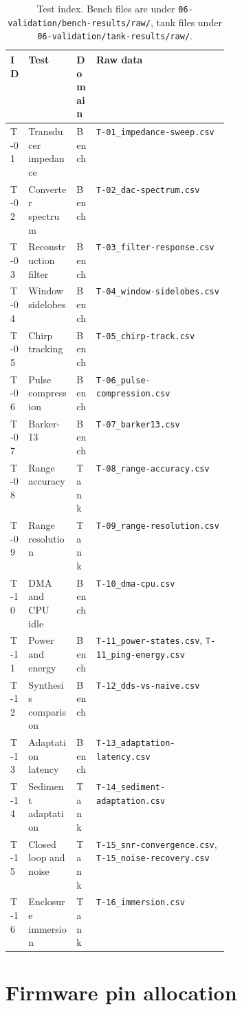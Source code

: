 \documentclass[11pt,a4paper]{article}
\begin{document}
\begin{table}[htbp]
\centering
\small
\begin{tabularx}{\linewidth}{L{0.06\linewidth}L{0.22\linewidth}L{0.09\linewidth}Y}
\toprule
\textbf{ID} & \textbf{Test} & \textbf{Domain} & \textbf{Raw data} \\
\midrule
T-01 & Transducer impedance & Bench & \texttt{T-01\_impedance-sweep.csv} \\
T-02 & Converter spectrum & Bench & \texttt{T-02\_dac-spectrum.csv} \\
T-03 & Reconstruction filter & Bench & \texttt{T-03\_filter-response.csv} \\
T-04 & Window sidelobes & Bench & \texttt{T-04\_window-sidelobes.csv} \\
T-05 & Chirp tracking & Bench & \texttt{T-05\_chirp-track.csv} \\
T-06 & Pulse compression & Bench & \texttt{T-06\_pulse-compression.csv} \\
T-07 & Barker-13 & Bench & \texttt{T-07\_barker13.csv} \\
T-08 & Range accuracy & Tank & \texttt{T-08\_range-accuracy.csv} \\
T-09 & Range resolution & Tank & \texttt{T-09\_range-resolution.csv} \\
T-10 & DMA and CPU idle & Bench & \texttt{T-10\_dma-cpu.csv} \\
T-11 & Power and energy & Bench & \texttt{T-11\_power-states.csv}, \texttt{T-11\_ping-energy.csv} \\
T-12 & Synthesis comparison & Bench & \texttt{T-12\_dds-vs-naive.csv} \\
T-13 & Adaptation latency & Bench & \texttt{T-13\_adaptation-latency.csv} \\
T-14 & Sediment adaptation & Tank & \texttt{T-14\_sediment-adaptation.csv} \\
T-15 & Closed loop and noise & Tank & \texttt{T-15\_snr-convergence.csv}, \texttt{T-15\_noise-recovery.csv} \\
T-16 & Enclosure immersion & Tank & \texttt{T-16\_immersion.csv} \\
\bottomrule
\end{tabularx}
\caption{Test index. Bench files are under
\texttt{06-validation/bench-results/raw/}, tank files under
\texttt{06-validation/tank-results/raw/}.}
\end{table}

\section{Firmware pin allocation}
\end{document}
